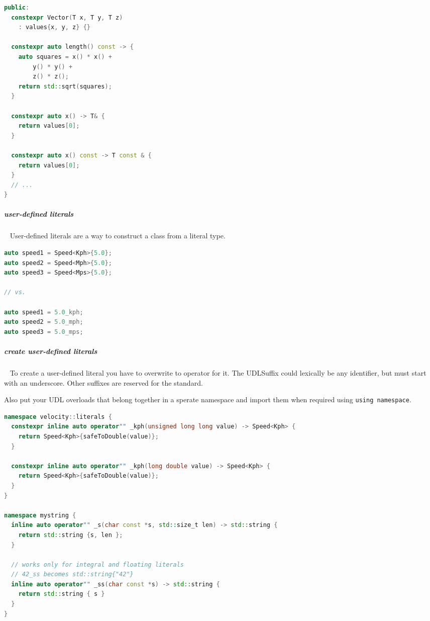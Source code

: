 \documentclass[11pt,twoside,landscape]{article}
\begin{document}
\begin{multicols}{2}
\begin{lstlisting}[language=c++,label=lst:example-for-a-literal-class-type,caption={Example for a literal class type},captionpos=b,numbers=none]
public:
  constexpr Vector(T x, T y, T z)
    : values{x, y, z} {}

  constexpr auto length() const -> {
    auto squares = x() * x() +
        y() * y() +
        z() * z();
    return std::sqrt(squares);
  }

  constexpr auto x() -> T& {
    return values[0];
  }

  constexpr auto x() const -> T const & {
    return values[0];
  }
  // ...
}
\end{lstlisting}

\subparagraph{user-defined literals} \
\label{sec:org9dae6c2}
User-defined literals are a way to construct a class from a literal type.

\begin{lstlisting}[language=c++,label=lst:user-defined-literals-in-action,caption={User-defined literals in action},captionpos=b,numbers=none]
auto speed1 = Speed<Kph>{5.0};
auto speed2 = Speed<Mph>{5.0};
auto speed3 = Speed<Mps>{5.0};

// vs.

auto speed1 = 5.0_kph;
auto speed2 = 5.0_mph;
auto speed3 = 5.0_mps;
\end{lstlisting}

\subparagraph{create user-defined literals} \
\label{sec:orgb8423ac}
To create a user-defined literal you have to overwrite to operator for it.
The UDLSuffix could lexically be any identifier, but must start with an underscore.
Other suffixes are reserved for the standard.

Also put your UDL overloads that belong together in a sperate namespace and import them when required using \texttt{using namespace}.

\begin{lstlisting}[language=c++,label=lst:user-defined-literal-for-speed,caption={user-defined literal for Speed},captionpos=b,numbers=none]
namespace velocity::literals {
  constexpr inline auto operator"" _kph(unsigned long long value) -> Speed<Kph> {
    return Speed<Kph>{safeToDouble(value)};
  }

  constexpr inline auto operator"" _kph(long double value) -> Speed<Kph> {
    return Speed<Kph>{safeToDouble(value)};
  }
}

namespace mystring {
  inline auto operator"" _s(char const *s, std::size_t len) -> std::string {
    return std::string {s, len };
  }

  // works only for integral and floating literals
  // 42_ss becomes std::string{"42"}
  inline auto operator"" _ss(char const *s) -> std::string {
    return std::string { s }
  }
}
\end{lstlisting}


\end{multicols}
\end{document}

